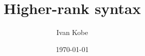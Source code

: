 \documentclass[11pt,a4paper]{report}
\title{Higher-rank syntax}
\author{Ivan Kobe}
\date{\today}
\begin{document}
\begin{titlepage}
\maketitle
\end{titlepage}

\cleardoublepage
\tableofcontents










\printbibliography[heading=bibintoc]
\end{document}
